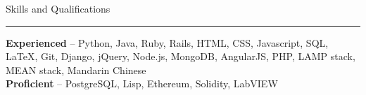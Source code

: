 \documentclass[11pt,letterpaper]{article}
\makeatletter
\newenvironment{topic}[1]
    {
    {\Large \centerline{#1}}
    \vspace*{0.03in}
    \hrule 
    \vspace*{0.05in}
    }
    {}
\newenvironment{event}
    {
    \begin{tabular*}{\textwidth}{l@{\extracolsep{\fill}}r}
    }
    {
    \end{tabular*}
    }
\newenvironment{detail}
    {
    \normalsize
    }
    {
    \vspace*{0.02in}
    }
\makeatother
\begin{document}





    \begin{topic}{Skills and Qualifications}
        \begin{detail}
            \textbf{Experienced} -- Python, Java, Ruby, Rails, HTML, CSS, Javascript, SQL, LaTeX, Git, Django, jQuery, Node.js, MongoDB, AngularJS, PHP, LAMP stack, MEAN stack, Mandarin Chinese\\
            \textbf{Proficient} -- PostgreSQL, Lisp, Ethereum, Solidity, LabVIEW
        \end{detail}
    \end{topic}

\end{document}
